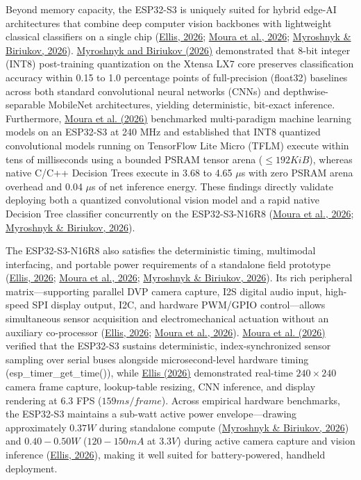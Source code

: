 \begin{thesisprose}
Beyond memory capacity, the ESP32-S3 is uniquely suited for hybrid edge-AI architectures that combine deep computer vision backbones with lightweight classical classifiers on a single chip (\hyperlink{cite.ellis2026}{Ellis, 2026}; \hyperlink{cite.moura2026}{Moura et al., 2026}; \hyperlink{cite.myroshnyk2026}{Myroshnyk \& Biriukov, 2026}). \hyperlink{cite.myroshnyk2026}{Myroshnyk and Biriukov (2026)} demonstrated that 8-bit integer (INT8) post-training quantization on the Xtensa LX7 core preserves classification accuracy within 0.15 to 1.0 percentage points of full-precision (float32) baselines across both standard convolutional neural networks (CNNs) and depthwise-separable MobileNet architectures, yielding deterministic, bit-exact inference. Furthermore, \hyperlink{cite.moura2026}{Moura et al. (2026)} benchmarked multi-paradigm machine learning models on an ESP32-S3 at 240 MHz and established that INT8 quantized convolutional models running on TensorFlow Lite Micro (TFLM) execute within tens of milliseconds using a bounded PSRAM tensor arena (\(\leq 192KiB\)), whereas native C/C++ Decision Trees execute in 3.68 to 4.65 \ensuremath{\mu}s with zero PSRAM arena overhead and 0.04 \ensuremath{\mu}s of net inference energy. These findings directly validate deploying both a quantized convolutional vision model and a rapid native Decision Tree classifier concurrently on the ESP32-S3-N16R8 (\hyperlink{cite.moura2026}{Moura et al., 2026}; \hyperlink{cite.myroshnyk2026}{Myroshnyk \& Biriukov, 2026}).

The ESP32-S3-N16R8 also satisfies the deterministic timing, multimodal interfacing, and portable power requirements of a standalone field prototype (\hyperlink{cite.ellis2026}{Ellis, 2026}; \hyperlink{cite.moura2026}{Moura et al., 2026}; \hyperlink{cite.myroshnyk2026}{Myroshnyk \& Biriukov, 2026}). Its rich peripheral matrix—supporting parallel DVP camera capture, I2S digital audio input, high-speed SPI display output, I2C, and hardware PWM/GPIO control—allows simultaneous sensor acquisition and electromechanical actuation without an auxiliary co-processor (\hyperlink{cite.ellis2026}{Ellis, 2026}; \hyperlink{cite.moura2026}{Moura et al., 2026}). \hyperlink{cite.moura2026}{Moura et al. (2026)} verified that the ESP32-S3 sustains deterministic, index-synchronized sensor sampling over serial buses alongside microsecond-level hardware timing (esp\_\allowbreak{}timer\_\allowbreak{}get\_\allowbreak{}time()), while \hyperlink{cite.ellis2026}{Ellis (2026)} demonstrated real-time \(240 \times 240\) camera frame capture, lookup-table resizing, CNN inference, and display rendering at 6.3 FPS (\(159ms/frame\)). Across empirical hardware benchmarks, the ESP32-S3 maintains a sub-watt active power envelope—drawing approximately \(0.37W\) during standalone compute (\hyperlink{cite.myroshnyk2026}{Myroshnyk \& Biriukov, 2026}) and \(0.40 - 0.50W\) (\(120 - 150mA\) at \(3.3V\)) during active camera capture and vision inference (\hyperlink{cite.ellis2026}{Ellis, 2026}), making it well suited for battery-powered, handheld deployment.


\end{thesisprose}
